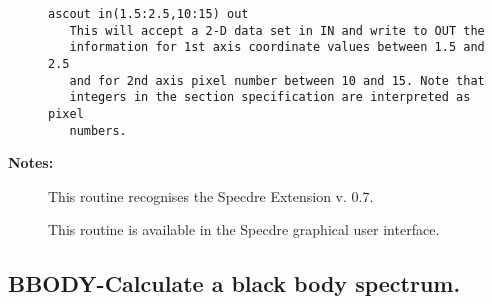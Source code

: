 \begin{description}
\begin{verbatim}
ascout in(1.5:2.5,10:15) out
   This will accept a 2-D data set in IN and write to OUT the
   information for 1st axis coordinate values between 1.5 and 2.5
   and for 2nd axis pixel number between 10 and 15. Note that
   integers in the section specification are interpreted as pixel
   numbers.
\end{verbatim}

\item [{\bf Notes:}]
This routine recognises the Specdre Extension v. 0.7.

This routine is available in the Specdre graphical user interface.
\end{description}
\subsection{BBODY-\label{BBODY}Calculate a black body spectrum.}
